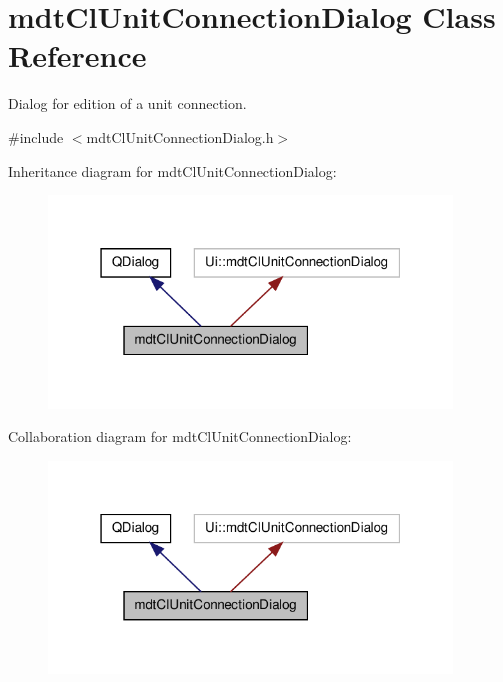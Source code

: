 \hypertarget{classmdt_cl_unit_connection_dialog}{\section{mdt\-Cl\-Unit\-Connection\-Dialog Class Reference}
\label{classmdt_cl_unit_connection_dialog}
}


Dialog for edition of a unit connection.  




{\ttfamily \#include $<$mdt\-Cl\-Unit\-Connection\-Dialog.\-h$>$}



Inheritance diagram for mdt\-Cl\-Unit\-Connection\-Dialog\-:\nopagebreak
\begin{figure}[H]
\begin{center}
\leavevmode
\includegraphics[width=304pt]{classmdt_cl_unit_connection_dialog__inherit__graph}
\end{center}
\end{figure}


Collaboration diagram for mdt\-Cl\-Unit\-Connection\-Dialog\-:\nopagebreak
\begin{figure}[H]
\begin{center}
\leavevmode
\includegraphics[width=304pt]{classmdt_cl_unit_connection_dialog__coll__graph}
\end{center}
\end{figure}
